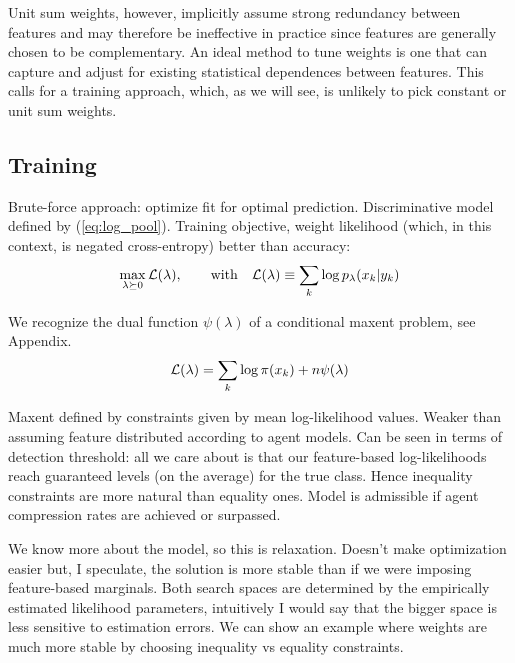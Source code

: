 \documentclass[english]{scrartcl}
\begin{document}
Unit sum weights, however, implicitly assume strong redundancy between features and may therefore be ineffective in practice since features are generally chosen to be complementary. An ideal method to tune weights is one that can capture and adjust for existing statistical dependences between features. This calls for a training approach, which, as we will see, is unlikely to pick constant or unit sum weights.


\subsection{Training}

Brute-force approach: optimize fit for optimal prediction. Discriminative model defined by (\ref{eq:log_pool}). Training objective, weight likelihood (which, in this context, is negated cross-entropy) better than accuracy:
$$
\max_{\lambda\succeq 0} {\cal L}(\lambda),
\qquad {\rm with} \quad
{\cal L}(\lambda)\equiv\sum_k \log p_\lambda(x_k|y_k)
$$

We recognize the dual function $\psi(\lambda)$ of a conditional maxent problem, see Appendix.
$$
{\cal L}(\lambda)
= 
\sum_k \log \pi(x_k)
+ n \psi(\lambda)
$$

Maxent defined by constraints given by mean log-likelihood values. Weaker than assuming feature distributed according to agent models. Can be seen in terms of detection threshold: all we care about is that our feature-based log-likelihoods reach guaranteed levels (on the average) for the true class. Hence inequality constraints are more natural than equality ones. Model is admissible if agent compression rates are achieved or surpassed.

We know more about the model, so this is relaxation. Doesn't make optimization easier but, I speculate, the solution is more stable than if we were imposing feature-based marginals. Both search spaces are determined by the empirically estimated likelihood parameters, intuitively I would say that the bigger space is less sensitive to estimation errors. We can show an example where weights are much more stable by choosing inequality vs equality constraints.

\end{document}
